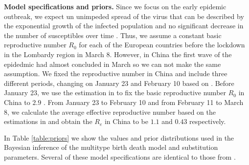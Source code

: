 \textbf{Model specifications and priors.} 
Since we focus on the early epidemic outbreak, we expect un unimpeded spread of the virus that can be described by the exponential growth of the infected population and no significant decrease in the number of susceptibles over time \cite{Boskova2014}. Thus, we assume a constant basic reproductive number $R_0$ for each of the European countries before the lockdown in the Lombardy region in March 8. However, in China the first wave of the epidedmic had almost concluded in March so we can not make the same assumption. We fixed the reproductive number in China and include three different periods, changing on January 23 and February 10 based on \cite{Pan2020} \cite{Wu2020} \cite{Xiao2020}. Before January 23, we use the estimation in \cite{Park2020} \cite{Billah2020} to fix the basic reproductive number $R_0$ in China to $2.9$ . From January 23 to February 10 and from February 11 to March 8, we calculate the average effective reproductive number based on the estimations in \cite{covidre} \cite{Huisman2020} and obtain the $R_e$ in China to be $1.1$ and $0.43$ respectively.   

In Table \ref{table:priors} we show the values and prior distributions used in the Bayesian inference of the multitype birth death model and substitution parameters. Several of these model specifications are identical to those from \cite{Nadeau2020}.

